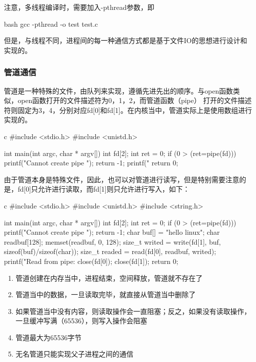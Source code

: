 注意，多线程编译时，需要加入-pthread参数，即
\begin{code-block}{bash}
gcc -pthread -o test test.c
\end{code-block}

但是，与线程不同，进程间的每一种通信方式都是基于文件IO的思想进行设计和实现的。

\subsubsection{管道通信}
管道是一种特殊的文件，由队列来实现，遵循先进先出的顺序。与open函数类似，open函数打开的文件描述符为0，1，2，而管道函数（pipe）
打开的文件描述符则固定为3，4，分别对应fd[0]和fd[1]。在内核当中，管道实际上是使用数组进行实现的。
\begin{code-block}{c}
#include <stdio.h>
#include <unistd.h>

int main(int argc, char * argv[])
{
        int fd[2];
        int ret = 0;
        if (0 > (ret=pipe(fd)))
        {
                printf("Cannot create pipe \n");
                return -1;
        }
        printf("%
        return 0;
}
\end{code-block}

由于管道本身是特殊文件，因此，也可以对管道进行读写，但是特别需要注意的是，fd[0]只允许进行读取，而fd[1]则只允许进行写入，如下：
\begin{code-block}{c}
#include <stdio.h>
#include <unistd.h>
#include <string.h>

int main(int argc, char * argv[])
{
        int fd[2];
        int ret = 0;
        if (0 > (ret=pipe(fd)))
        {
                printf("Cannot create pipe \n");
                return -1;
        }
        char buf[] = "hello linux";
        char readbuf[128];
        memset(readbuf, 0, 128);
        size_t writed = write(fd[1], buf, sizeof(buf)/sizeof(char));
        size_t readed = read(fd[0], readbuf, writed);
        printf("Read from pipe: %
        close(fd[0]);
        close(fd[1]);
        return 0;
}
\end{code-block}

\begin{enumerate}
  \item 管道创建在内存当中，进程结束，空间释放，管道就不存在了
  \item 管道当中的数据，一旦读取完毕，就直接从管道当中删除了
  \item 如果管道当中没有内容，则读取操作会一直阻塞；反之，如果没有读取操作，一旦缓冲写满（65536），则写入操作会阻塞
  \item 管道最大为65536字节
  \item 无名管道只能实现父子进程之间的通信
\end{enumerate}

